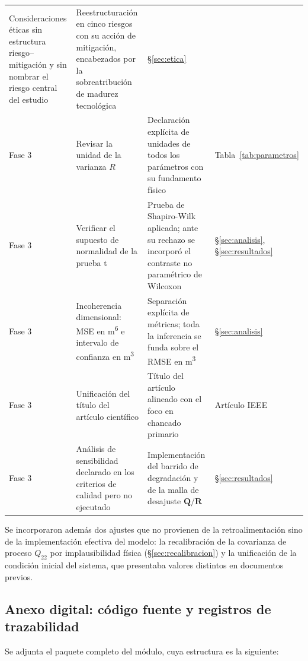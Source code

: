 \begin{table}[H]
\begin{tabular}{@{}p{1.8cm}p{4.6cm}p{4.6cm}p{2.4cm}@{}}
Consideraciones éticas sin estructura riesgo--mitigación y sin nombrar el riesgo
central del estudio &
Reestructuración en cinco riesgos con su acción de mitigación, encabezados por
la sobreatribución de madurez tecnológica &
\S\ref{sec:etica}\\
\addlinespace
Fase 3 &
Revisar la unidad de la varianza $R$ &
Declaración explícita de unidades de todos los parámetros con su fundamento
físico &
Tabla~\ref{tab:parametros}\\
\addlinespace
Fase 3 &
Verificar el supuesto de normalidad de la prueba t &
Prueba de Shapiro-Wilk aplicada; ante su rechazo se incorporó el contraste no
paramétrico de Wilcoxon &
\S\ref{sec:analisis}, \S\ref{sec:resultados}\\
\addlinespace
Fase 3 &
Incoherencia dimensional: MSE en \si{\metre\tothe{6}} e intervalo de confianza
en \si{\metre\cubed} &
Separación explícita de métricas; toda la inferencia se funda sobre el RMSE en
\si{\metre\cubed} &
\S\ref{sec:analisis}\\
\addlinespace
Fase 3 &
Unificación del título del artículo científico &
Título del artículo alineado con el foco en chancado primario &
Artículo IEEE\\
\addlinespace
Fase 3 &
Análisis de sensibilidad declarado en los criterios de calidad pero no
ejecutado &
Implementación del barrido de degradación y de la malla de desajuste
$\mathbf{Q}/\mathbf{R}$ &
\S\ref{sec:resultados}\\
\bottomrule
\end{tabular}
\end{table}

Se incorporaron además dos ajustes que no provienen de la retroalimentación sino
de la implementación efectiva del modelo: la recalibración de la covarianza de
proceso $Q_{22}$ por implausibilidad física
(\S\ref{sec:recalibracion}) y la unificación de la condición inicial del
sistema, que presentaba valores distintos en documentos previos.

\subsection{Anexo digital: código fuente y registros de trazabilidad}
\label{anexo:codigo}

Se adjunta el paquete completo del módulo, cuya estructura es la siguiente:


